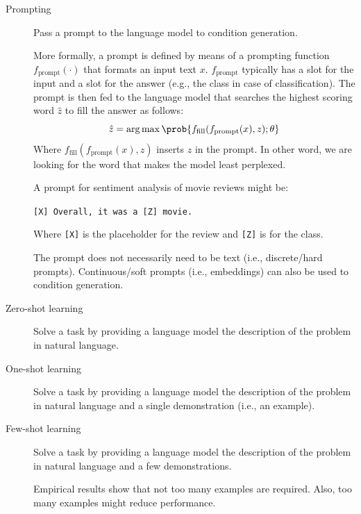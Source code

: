 \begin{description}
    \item[Prompting] 
        Pass a prompt to the language model to condition generation.

        More formally, a prompt is defined by means of a prompting function $f_\text{prompt}(\cdot)$ that formats an input text $x$. $f_\text{prompt}$ typically has a slot for the input and a slot for the answer (e.g., the class in case of classification). The prompt is then fed to the language model that searches the highest scoring word $\hat{z}$ to fill the answer as follows:
        \[ \hat{z} = \arg\max \prob{ f_\text{fill}(f_\text{prompt}(x), z); \theta } \]
        Where $f_\text{fill}(f_\text{prompt}(x), z)$ inserts $z$ in the prompt. In other word, we are looking for the word that makes the model least perplexed.

        \begin{example}
            A prompt for sentiment analysis of movie reviews might be:
            \begin{center}
                \texttt{[X] Overall, it was a [Z] movie.}
            \end{center}
            Where \texttt{[X]} is the placeholder for the review and \texttt{[Z]} is for the class.
        \end{example}

        \begin{remark}
            The prompt does not necessarily need to be text (i.e., discrete/hard prompts). Continuous/soft prompts (i.e., embeddings) can also be used to condition generation.
        \end{remark}


    \item[Zero-shot learning] 
        Solve a task by providing a language model the description of the problem in natural language.

    \item[One-shot learning] 
        Solve a task by providing a language model the description of the problem in natural language and a single demonstration (i.e., an example).

    \item[Few-shot learning] 
        Solve a task by providing a language model the description of the problem in natural language and a few demonstrations.

        \begin{remark}
            Empirical results show that not too many examples are required. Also, too many examples might reduce performance.
        \end{remark}
\end{description}

